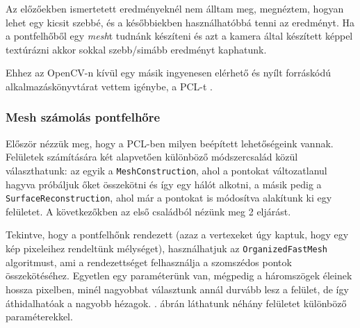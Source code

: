 \documentclass[a4paper,oneside]{article}
\begin{document}
Az előzőekben ismertetett eredményeknél nem álltam meg, megnéztem, hogyan lehet egy kicsit szebbé, és a későbbiekben használhatóbbá tenni az eredményt. Ha a pontfelhőből egy \textit{mesh}t tudnánk készíteni és azt a kamera által készített képpel textúrázni akkor sokkal szebb/simább eredményt kaphatunk.

Ehhez az OpenCV-n kívül egy másik ingyenesen elérhető és nyílt forráskódú alkalmazáskönyvtárat vettem igénybe, a PCL-t \cite{pcl}.

\subsubsection{Mesh számolás pontfelhőre}

Először nézzük meg, hogy a PCL-ben milyen beépített lehetőségeink vannak. Felületek számítására két alapvetően különböző módszercsalád közül választhatunk: az egyik a \texttt{MeshConstruction}, ahol a pontokat változatlanul hagyva próbáljuk őket összekötni és így egy hálót alkotni, a másik pedig a \texttt{SurfaceReconstruction}, ahol már a pontokat is módosítva alakítunk ki egy felületet. A következőkben az első családból nézünk meg 2 eljárást.

Tekintve, hogy a pontfelhőnk rendezett (azaz a vertexeket úgy kaptuk, hogy egy kép pixeleihez rendeltünk mélységet), használhatjuk az \texttt{OrganizedFastMesh} \cite{organizedfastmesh} algoritmust, ami a rendezettséget felhasználja a szomszédos pontok összekötéséhez. Egyetlen egy paraméterünk van, mégpedig a háromszögek éleinek hossza pixelben, minél nagyobbat választunk annál durvább lesz a felület, de így áthidalhatóak a nagyobb hézagok. . ábrán láthatunk néhány felületet különböző paraméterekkel.
\end{document}
